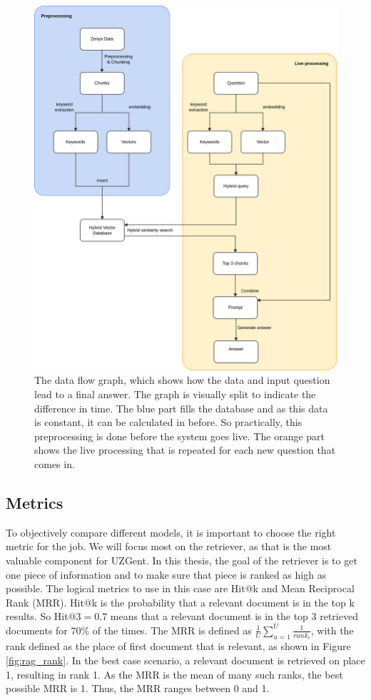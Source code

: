 \begin{figure}[H]
    \centerline{\includegraphics[width=0.8\linewidth]{fig/dataflow_graph.png}}
    \caption{The data flow graph, which shows how the data and input question lead to a final answer. The graph is visually split to indicate the difference in time. The blue part fills the database and as this data is constant, it can be calculated in before. So practically, this preprocessing is done before the system goes live. The orange part shows the live processing that is repeated for each new question that comes in.}
    \label{fig:dataflow_graph}
\end{figure}

\subsection{Metrics}
To objectively compare different models, it is important to choose the right metric for the job. We will focus most on the retriever, as that is the most valuable component for UZGent. In this thesis, the goal of the retriever is to get one piece of information and to make sure that piece is ranked as high as possible. The logical metrics to use in this case are Hit@k and Mean Reciprocal Rank (MRR). Hit@k is the probability that a relevant document is in the top k results. So Hit@3$=0.7$ means that a relevant document is in the top 3 retrieved documents for 70\% of the times. The MRR is defined as $\frac{1}{U} \sum_{u=1}^U \frac{1}{rank_i}$, with the rank defined as the place of first document that is relevant, as shown in Figure \ref{fig:rag_rank}. In the best case scenario, a relevant document is retrieved on place 1, resulting in rank 1. As the MRR is the mean of many such ranks, the best possible MRR is 1. Thus, the MRR ranges between 0 and 1.

